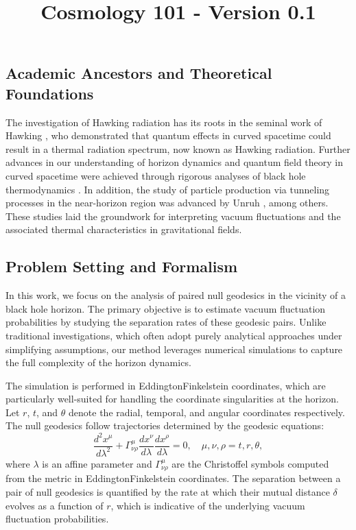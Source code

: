 \documentclass{article}\usepackage{graphicx} \usepackage{amsmath} \usepackage{colortbl}\title{Cosmology 101 - Version 0.1}
\begin{document}
\subsection{Academic Ancestors and Theoretical Foundations}
The investigation of Hawking radiation has its roots in the seminal work of Hawking \cite{Hawking1975}, who demonstrated that quantum effects in curved spacetime could result in a thermal radiation spectrum, now known as Hawking radiation. Further advances in our understanding of horizon dynamics and quantum field theory in curved spacetime were achieved through rigorous analyses of black hole thermodynamics \cite{Jacobson1993}. In addition, the study of particle production via tunneling processes in the near-horizon region was advanced by Unruh \cite{Unruh1976}, among others. These studies laid the groundwork for interpreting vacuum fluctuations and the associated thermal characteristics in gravitational fields.

\subsection{Problem Setting and Formalism}
In this work, we focus on the analysis of paired null geodesics in the vicinity of a black hole horizon. The primary objective is to estimate vacuum fluctuation probabilities by studying the separation rates of these geodesic pairs. Unlike traditional investigations, which often adopt purely analytical approaches under simplifying assumptions, our method leverages numerical simulations to capture the full complexity of the horizon dynamics.

The simulation is performed in Eddington\textendash Finkelstein coordinates, which are particularly well-suited for handling the coordinate singularities at the horizon. Let $r$, $t$, and $\theta$ denote the radial, temporal, and angular coordinates respectively. The null geodesics follow trajectories determined by the geodesic equations:
\begin{equation}
\frac{d^2 x^\mu}{d\lambda^2} + \Gamma^\mu_{\nu \rho}\frac{dx^\nu}{d\lambda}\frac{dx^\rho}{d\lambda} = 0, \quad \mu,\nu,\rho = t,r,\theta, \label{eq:geodesic}
\end{equation}
where $\lambda$ is an affine parameter and $\Gamma^\mu_{\nu \rho}$ are the Christoffel symbols computed from the metric in Eddington\textendash Finkelstein coordinates. The separation between a pair of null geodesics is quantified by the rate at which their mutual distance $\delta$ evolves as a function of $r$, which is indicative of the underlying vacuum fluctuation probabilities.
\end{document}

